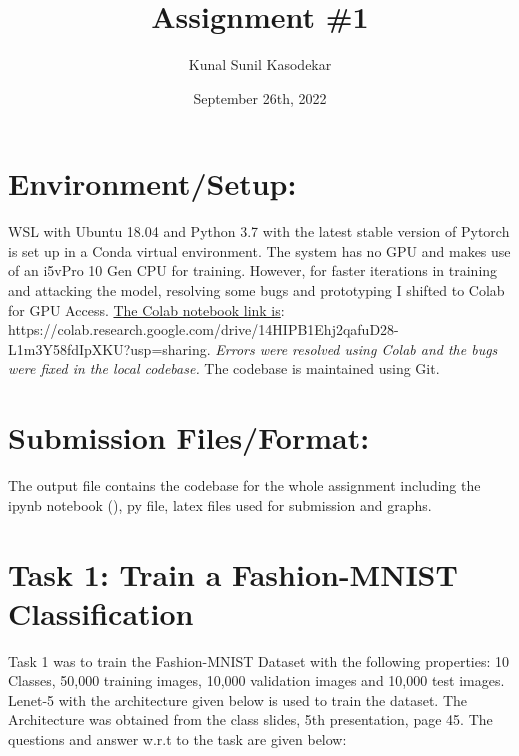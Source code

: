 \documentclass[
	12pt, %
]{fphw}
\title{Assignment \#1} %
\author{Kunal Sunil Kasodekar} %
\date{September 26th, 2022} %
\institute{Arizona State University} %
\begin{document}
\maketitle %

\section*{Environment/Setup:}

WSL with Ubuntu 18.04 and Python 3.7 with the latest stable version of Pytorch is set up in a Conda virtual environment. The system has no GPU and makes use of an i5vPro 10 Gen CPU for training.
However, for faster iterations in training and attacking the model, resolving some bugs and prototyping I shifted to Colab for GPU Access. 
\newline
\underline{The Colab notebook link is}:
https://colab.research.google.com/drive/14HIPB1Ehj2qafuD28-L1m3Y58fdIpXKU?usp=sharing.
\textit{Errors were resolved using Colab and the bugs were fixed in the local codebase.}
The codebase is maintained using Git.

\section*{Submission Files/Format:}
The output file contains the codebase for the whole assignment including the ipynb notebook (\JupyterNotebookfroAssignment), py file, latex files used for submission and graphs.

\section*{Task 1: Train a Fashion-MNIST Classification}

Task 1 was to train the Fashion-MNIST Dataset with the following properties: 10 Classes, 50,000 training images, 10,000 validation images and 10,000 test images. Lenet-5 with the architecture given below is used to train the dataset. The Architecture was obtained from the class slides, 5th presentation, page 45. The questions and answer w.r.t to the task are given below:
\end{document}
